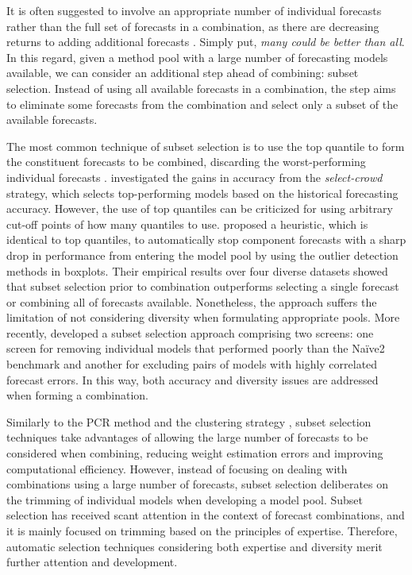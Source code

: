 \documentclass[11pt]{article}
\begin{document}
It is often suggested to involve an appropriate number of individual forecasts rather than the full set of forecasts in a combination, as there are decreasing returns to adding additional forecasts \citep{Armstrong2001-sj,Zhou2002-cg,Hibon2005-ok,Geweke2011-xk,Lichtendahl2020-ut}. Simply put, \textit{many could be better than all}. In this regard, given a method pool with a large number of forecasting models available, we can consider an additional step ahead of combining: subset selection. Instead of using all available forecasts in a combination, the step aims to eliminate some forecasts from the combination and select only a subset of the available forecasts.

The most common technique of subset selection is to use the top quantile to form the constituent forecasts to be combined, discarding the worst-performing individual forecasts \citep[e.g.,][]{Granger2004-sw}. \citet{Mannes2014-dl} investigated the gains in accuracy from the \textit{select-crowd} strategy, which selects top-performing models based on the historical forecasting accuracy. However, the use of top quantiles can be criticized for using arbitrary cut-off points of how many quantiles to use. \citet{Kourentzes2019-na} proposed a heuristic, which is identical to top quantiles, to automatically stop component forecasts with a sharp drop in performance from entering the model pool by using the outlier detection methods in boxplots. Their empirical results over four diverse datasets showed that subset selection prior to combination outperforms selecting a single forecast or combining all of forecasts available. Nonetheless, the approach suffers the limitation of not considering diversity when formulating appropriate pools. More recently, \citet{Lichtendahl2020-ut} developed a subset selection approach comprising two screens: one screen for removing individual models that performed poorly than the Na\"{i}ve2 benchmark and another for excluding pairs of models with highly correlated forecast errors. In this way, both accuracy and diversity issues are addressed when forming a combination.

Similarly to the PCR method \citep{Stock2004-rq} and the clustering strategy \citep{Aiolfi2006-rh}, subset selection techniques take advantages of allowing the large number of forecasts to be considered when combining, reducing weight estimation errors and improving computational efficiency. However, instead of focusing on dealing with combinations using a large number of forecasts, subset selection deliberates on the trimming of individual models when developing a model pool. Subset selection has received scant attention in the context of forecast combinations, and it is mainly focused on trimming based on the principles of expertise. Therefore, automatic selection techniques considering both expertise and diversity merit further attention and development.
\end{document}
